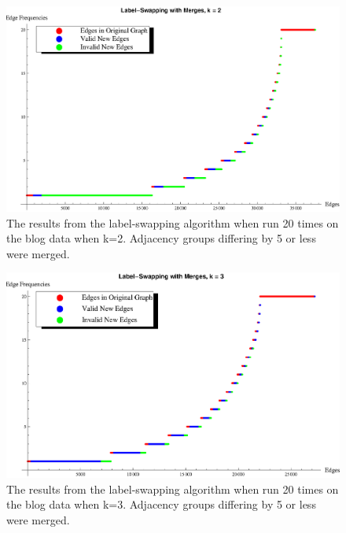 \begin{figure}[ht]
\centerline{ \includegraphics[scale=0.3]{s40_k_2_det_graph.eps}}
  \caption{The results from the label-swapping algorithm when run 20 times on the blog data when k=2. Adjacency groups differing by 5 or less were merged.}
  \label{fig:s40-k=2-merge}
\end{figure}

\begin{figure}[ht]
\centerline{\includegraphics[scale=0.3]{s40_k_3_det_graph.eps}}
  \caption{The results from the label-swapping algorithm when run 20 times on the blog data when k=3. Adjacency groups differing by 5 or less were merged.}
  \label{fig:s40-k=3-merge}
\end{figure}
